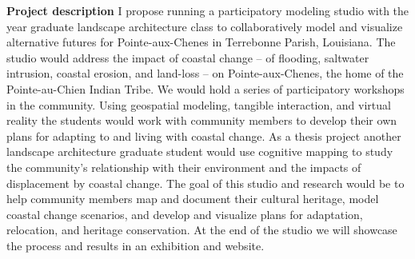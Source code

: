 \documentclass[11pt,article,oneside]{memoir}
\begin{document}


\noindent \textbf{Project description}
I propose running a participatory modeling studio 
with the  year graduate landscape architecture class
to collaboratively model and visualize alternative futures 
for Pointe-aux-Chenes in Terrebonne Parish, Louisiana.   
%
The studio would address 
the impact of coastal change 
-- of flooding, saltwater intrusion, coastal erosion, and land-loss --
on Pointe-aux-Chenes, 
the home of the Pointe-au-Chien Indian Tribe.
%
We would hold a series of participatory workshops 
in the community.
%
Using geospatial modeling, tangible interaction, and virtual reality
the students would work with community members to develop 
their own plans for adapting to and living with coastal change.
%
As a thesis project
another landscape architecture graduate student
would use cognitive mapping 
to study the community's relationship with their environment
and the impacts of displacement by coastal change.
%
The goal of this studio and research 
would be to help community members 
map and document their cultural heritage,
model coastal change scenarios,
and develop and visualize plans
for adaptation, relocation, and heritage conservation. 
%
At the end of the studio we will showcase 
the process and results in an exhibition 
and website. \\

\end{document}
